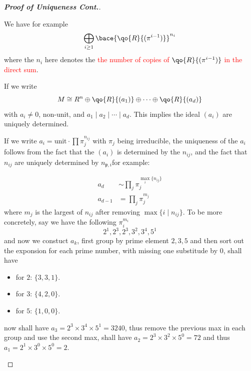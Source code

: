 \begin{proof}[\textbf{Proof of Uniqueness Cont.}]
	\begin{note}
		We have for example
		\[
			\bigoplus_{i\geq 1} \bace{\qo{R}{(\pi^{i-1})}}^{n_i}
		\]
		where the \( n_i \) here denotes the \textcolor{red}{the number of copies of \( \qo{R}{(\pi^{i-1})} \) in the direct sum}.
	\end{note}

	\begin{claim}
		If we write
		\[
			M \cong R^n \oplus \qo{R}{(a_1)} \oplus \cdots \oplus \qo{R}{(a_d)}
		\]
		with \( a_i \ne 0 \), non-unit, and \( a_1 \mid a_2 \mid \cdots \mid a_d \). This implies the
		ideal \( (a_i) \) are uniquely determined.
	\end{claim}

	\begin{note}
		If we write \( a_i = \text{unit} \cdot \prod \pi_j^{n_{ij}} \) with \( \pi_j \) being
		irreducible, the uniqueness of the \( a_i \) follows from the fact that the \( (a_i) \) is
		determined by the \( n_{ij} \), and the fact that \( n_{ij} \) are uniquely determined by \(
		n_{\mathfrak p,i} \)for example:
		\begin{eg}
			\leavevmode
			\begin{align*}
				a_d     & \sim \prod_{j} \pi_j^{\max_{i}\{n_{ij}\}} \\
				a_{d-1} & = \prod_{j} \pi_{j}^{m_j}
			\end{align*}
			where \( m_j \) is the largest of \( n_{ij} \) after removing \( \max\{i \; | \; n_{ij}\} \).
			To be more concretely, say we have the following \( \pi_i^{m_i} \)
			\[
				2^1, 2^3, 2^3, 3^2,3^4,5^1
			\]
			and now we constuct \( a_k \), first group by prime element \( 2,3,5 \) and then sort out the
			exponsion for each prime number, with missing one substitude by \( 0 \), shall have
			\begin{itemize}
				\item for $2$: \( \{3,3,1\} \).
				\item for \( 3 \): \( \{4,2,0\} \).
				\item for \( 5 \): \( \{1,0,0\} \).
			\end{itemize}
			now shall have \( a_3 = 2^3 \times 3^4 \times 5^1 = 3240 \), thus remove the previous max in
			each group and use the second max, shall have \( a_2 = 2^3 \times 3^2 \times 5^0 = 72 \) and
			thus \( a_1 = 2^1 \times 3^0 \times 5^0 = 2 \).
		\end{eg}
	\end{note}
\end{proof}

